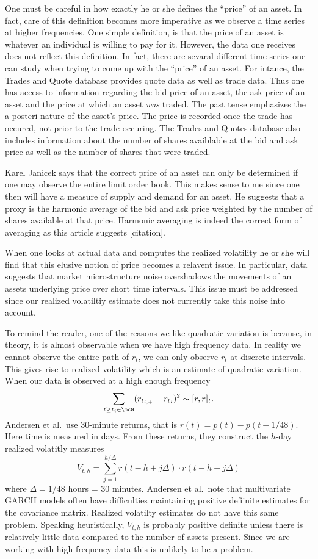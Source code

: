 \documentclass{report}
\begin{document}
\begin{remark}
One must be careful in how exactly he or she defines the ``price'' of
an asset.  In fact, care of this definition becomes more imperative as
we observe a time series at higher frequencies.  One simple
definition, is that the price of an asset is whatever an individual is
willing to pay for it.  However, the data one receives does not
reflect this definition.  In fact, there are sevaral different time
series one can study when trying to come up with the ``price'' of an
asset.  For intance, the Trades and Quote database provides quote data
as well as trade data.  Thus one has access to information regarding
the bid price of an asset, the ask price of an asset and the price at
which an asset \emph{was} traded.  The past tense emphasizes the a
posteri nature of the asset's price.  The price is recorded once the
trade has occured, not prior to the trade occuring.  The Trades and
Quotes database also includes information about the number of shares
avaiblable at the bid and ask price as well as the number of shares
that were traded.

Karel Janicek says that the correct price of an asset can only be
determined if one may observe the entire limit order book.  This makes
sense to me since one then will have a measure of supply and demand
for an asset.  He suggests that a proxy is the harmonic average of the
bid and ask price weighted by the number of shares available at that
price.  Harmonic averaging is indeed the correct form of averaging as
this article suggests [citation].

When one looks at actual data and computes the realized volatility he
or she will find that this elusive notion of price becomes a relavent
issue.  In particular, data suggests that market microstructure noise
overshadows the movements of an assets underlying price over short
time intervals.  This issue must be addressed since our realized
volatiltiy estimate does not currently take this noise into account. 
\end{remark}

To remind the reader, one of the reasons we like quadratic variation
is because, in theory, it is almost observable when we have high
frequency data.  In reality we cannot observe the entire path of
$r_t$, we can only observe $r_t$ at discrete intervals.  This gives
rise to realized volatility which is an estimate of quadratic
variation.  When our data is observed at a high enough frequency 
\[
\sum_{t \geq t_i \in \mcG} (r_{t_{i,+}} - r_{t_i})^2 \sim [r,r]_t.
\]
Andersen et al.\ use 30-minute returns, that is $r(t) = p(t) - 
p(t-1/48)$.  Here time is measured in days.  From these returns, they
construct the $h$-day realized volatitly measures
\[
V_{t,h} = \sum_{j = 1}^{h/\Delta} r(t-h+j \Delta) \cdot r(t-h+j
\Delta)
\]
where $\Delta = 1/48$ hours = 30 minutes.  Andersen et al.\ note that
multivariate GARCH models often have difficulties maintaining positive
defiinite estimates for the covariance matrix.  Realized volatilty
estimates do not have this same problem.  Speaking heuristically,
$V_{t,h}$ is probably positive definite unless there is relatively
little data compared to the number of assets present.  Since we are
working with high frequency data this is unlikely to be a problem.
\end{document}
